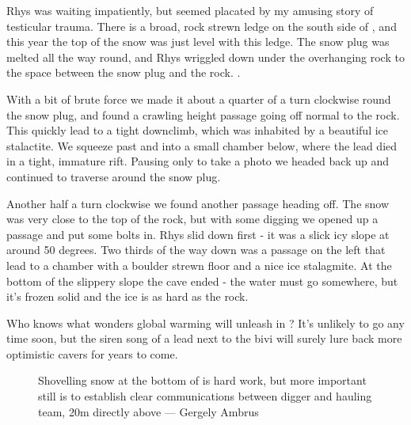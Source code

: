 Rhys was waiting impatiently, but seemed placated by my amusing story of testicular trauma. There is a broad, rock strewn ledge on the south side of  , and this year the top of the snow was just level with this ledge. The snow plug was melted all the way round, and Rhys wriggled down under the overhanging rock to the space between the snow plug and the rock. .

With a bit of brute force we made it about a quarter of a turn clockwise round the snow plug, and found a crawling height passage going off normal to the rock. This quickly lead to a tight downclimb, which was inhabited by a beautiful ice stalactite. We squeeze past and into a small chamber below, where the lead died in a tight, immature rift. Pausing only to take a photo we headed back up and continued to traverse around the snow plug.



Another half a turn clockwise we found another passage heading off. The snow was very close to the top of the rock, but with some digging we opened up a passage and put some bolts in. Rhys slid down first - it was a slick icy slope at around 50 degrees. Two thirds of the way down was a passage on the left that lead to a chamber with a boulder strewn floor and a nice ice stalagmite. At the bottom of the slippery slope the cave ended - the water must go somewhere, but it’s frozen solid and the ice is as hard as the rock.

Who knows what wonders global warming will unleash in  ? It’s unlikely to go any time soon, but the siren song of a lead next to the bivi will surely lure back more optimistic cavers for years to come.

\begin{figure}[b!]
\checkoddpage \ifoddpage \forcerectofloat \else \forceversofloat \fi
\centering
{}
\caption{Shovelling snow at the bottom of \protect{} is hard work, but more important still is to establish clear communications between digger and hauling team, 20m directly above --- Gergely Ambrus}
\label{bottom of M10}
\end{figure}

